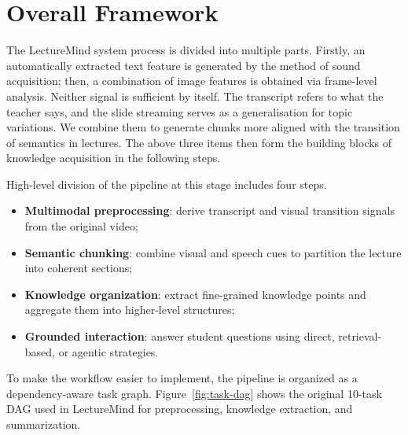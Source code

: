 \section{Overall Framework}

The LectureMind system process is divided into multiple parts. Firstly, an automatically extracted text feature is generated by the method of sound acquisition; then, a combination of image features is obtained via frame-level analysis. Neither signal is sufficient by itself. The transcript refers to what the teacher says, and the slide streaming serves as a generalisation for topic variations. We combine them to generate chunks more aligned with the transition of semantics in lectures. The above three items then form the building blocks of knowledge acquisition in the following steps.

High-level division of the pipeline at this stage includes four steps.

\begin{itemize}
\item \textbf{Multimodal preprocessing}: derive transcript and visual transition signals from the original video;
\item \textbf{Semantic chunking}: combine visual and speech cues to partition the lecture into coherent sections;
\item \textbf{Knowledge organization}: extract fine-grained knowledge points and aggregate them into higher-level structures;
\item \textbf{Grounded interaction}: answer student questions using direct, retrieval-based, or agentic strategies.
\end{itemize}

To make the workflow easier to implement, the pipeline is organized as a dependency-aware task graph. Figure~\ref{fig:task-dag} shows the original 10-task DAG used in LectureMind for preprocessing, knowledge extraction, and summarization.

